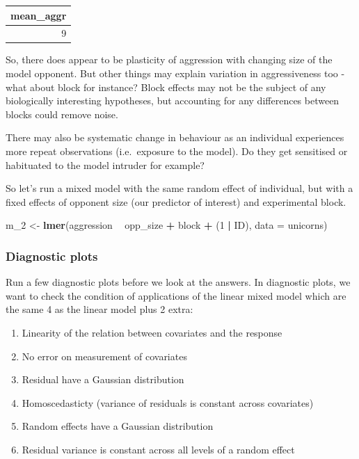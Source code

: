 \documentclass[
  12pt,
]{book}
\newenvironment{Shaded}{\begin{snugshade}}{\end{snugshade}}
\newcommand{\DataTypeTok}[1]{\textcolor[rgb]{0.13,0.29,0.53}{#1}}
\newcommand{\DecValTok}[1]{\textcolor[rgb]{0.00,0.00,0.81}{#1}}
\newcommand{\KeywordTok}[1]{\textcolor[rgb]{0.13,0.29,0.53}{\textbf{#1}}}
\newcommand{\NormalTok}[1]{#1}
\newcommand{\OperatorTok}[1]{\textcolor[rgb]{0.81,0.36,0.00}{\textbf{#1}}}
\newcommand{\StringTok}[1]{\textcolor[rgb]{0.31,0.60,0.02}{#1}}
\begin{document}
\begin{tabular}{r}
\hline
mean\_aggr\\
\hline
9\\
\hline
\end{tabular}

So, there does appear to be plasticity of aggression with changing size of the model opponent. But other things may explain variation in aggressiveness too - what about block for instance? Block effects may not be the subject of any biologically interesting hypotheses, but accounting for any differences between blocks could remove noise.

There may also be systematic change in behaviour as an individual experiences more repeat observations (i.e.~exposure to the model). Do they get sensitised or habituated to the model intruder for example?

So let's run a mixed model with the same random effect of individual, but with a fixed effects of opponent size (our predictor of interest) and experimental block.

\begin{Shaded}
\begin{Highlighting}[]
\NormalTok{m_}\DecValTok{2}\NormalTok{ <-}\StringTok{ }\KeywordTok{lmer}\NormalTok{(aggression }\OperatorTok{~}\StringTok{ }\NormalTok{opp_size  }\OperatorTok{+}\StringTok{ }\NormalTok{block }\OperatorTok{+}\StringTok{ }\NormalTok{(}\DecValTok{1} \OperatorTok{|}\StringTok{ }\NormalTok{ID), }\DataTypeTok{data =}\NormalTok{ unicorns)}
\end{Highlighting}
\end{Shaded}

\hypertarget{diagnostic-plots}{%
\subsubsection{Diagnostic plots}\label{diagnostic-plots}}

Run a few diagnostic plots before we look at the answers. In diagnostic plots, we want to check the condition of applications of the linear mixed model which are the same 4 as the linear model plus 2 extra:

\begin{enumerate}
\def\labelenumi{\arabic{enumi}.}
\item
  Linearity of the relation between covariates and the response
\item
  No error on measurement of covariates
\item
  Residual have a Gaussian distribution
\item
  Homoscedasticty (variance of residuals is constant across covariates)
\item
  Random effects have a Gaussian distribution
\item
  Residual variance is constant across all levels of a random effect
\end{enumerate}
\end{document}
